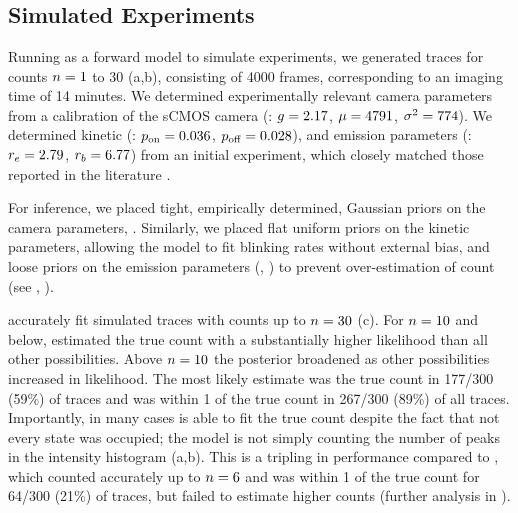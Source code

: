 




\section{}

\subsection{Simulated Experiments}
Running \ours as a forward model to simulate experiments, 
we generated traces for counts $n=1$ to 30 (a,b), 
consisting of 4000 frames, corresponding to an imaging time of 14 minutes.
	We determined experimentally relevant camera parameters from a calibration of the
	sCMOS camera (\parametersc: $g=2.17$, $\mu=4791$, $\sigma^2=774$). 
	We determined kinetic (\parameterst: $p_\text{on}=0.036$, $p_\text{off}=0.028$), and emission parameters 
	(\parameterse: $r_e=2.79$, $r_b=6.77$) from an initial experiment, 
	which closely matched those reported in the literature \cite{stein_2021}.

For inference, we placed tight, empirically determined, Gaussian priors on 
the camera parameters,
	.
	Similarly, we placed flat uniform priors on the kinetic parameters, allowing the model 
	to fit blinking rates without external bias,
	and loose priors on the emission parameters (\rb, \re) to prevent 
	over-estimation of count (see , ). 

	
\ours accurately fit simulated traces with counts up to $n=30$ (c).
	For $n=10$ and below, \ours estimated the true count with a substantially 
	higher likelihood than all other possibilities. 
	Above $n=10$ the posterior broadened as other possibilities increased in likelihood. 
	The most likely estimate was the true count in 177/300 (59\%) of traces and 
	was within 1 of the true count in 267/300 (89\%) of all traces.
	Importantly, in many cases \ours is able to fit the true count despite the fact that 
	not every state was occupied; \ie the model is not simply counting the 
	number of peaks in the intensity histogram (a,b).
	This is a tripling in performance compared to \lbfcs, which counted 
	accurately up to $n=6$ and was within 1 of the true count for 64/300 (21\%) of traces, 
	but failed to estimate higher counts (further analysis in ).


